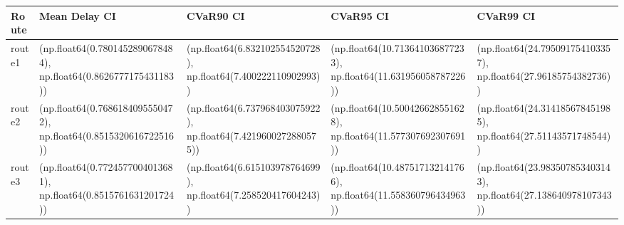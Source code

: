 \begin{tabular}{lllll}
\toprule
Route & Mean Delay CI & CVaR90 CI & CVaR95 CI & CVaR99 CI \\
\midrule
route1 & (np.float64(0.7801452890678484), np.float64(0.8626777175431183)) & (np.float64(6.832102554520728), np.float64(7.400222110902993)) & (np.float64(10.713641036877233), np.float64(11.631956058787226)) & (np.float64(24.795091754103357), np.float64(27.96185754382736)) \\
route2 & (np.float64(0.7686184095550472), np.float64(0.8515320616722516)) & (np.float64(6.737968403075922), np.float64(7.4219600272880575)) & (np.float64(10.500426628551628), np.float64(11.577307692307691)) & (np.float64(24.314185678451985), np.float64(27.51143571748544)) \\
route3 & (np.float64(0.7724577004013681), np.float64(0.8515761631201724)) & (np.float64(6.615103978764699), np.float64(7.258520417604243)) & (np.float64(10.487517132141766), np.float64(11.558360796434963)) & (np.float64(23.983507853403143), np.float64(27.138640978107343)) \\
\bottomrule
\end{tabular}
